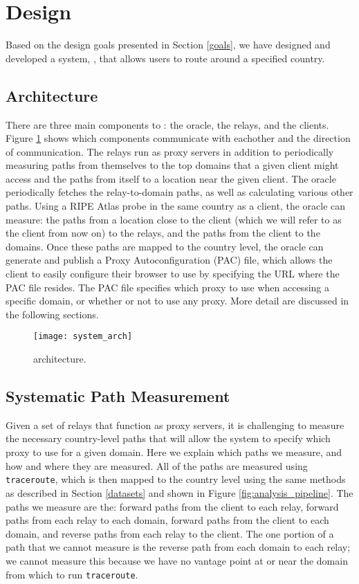 \section{Design}
\label{system_design}
Based on the design goals presented in Section \ref{goals}, we have designed 
and developed a system, \system{}, that allows users to route around a specified 
country.

\subsection{Architecture}

There are three main components to \system{}: the oracle, the relays, and the 
clients.  Figure \ref{fig:arch} shows which components communicate with 
eachother and the direction of communication.  The relays run as 
proxy servers in addition to periodically measuring paths from themselves to the 
top domains that a given client might access and the paths from itself to a 
location near the given client.  The oracle periodically fetches the 
relay-to-domain paths, as well as calculating various other paths.  Using a RIPE
 Atlas probe in the same country as a client, the oracle can measure: the paths
 from a location close to the client (which we will refer to as the client from 
now on) to the relays, and the paths from the client to the domains.  Once these
 paths are mapped to the country level, the oracle can generate and publish a 
Proxy Autoconfiguration (PAC) file, which allows the client to easily configure 
their browser to use \system{} by specifying the URL where the PAC file resides.
  The PAC file specifies which proxy to use when accessing a specific domain, 
or whether or not to use any proxy.  More detail are discussed in the following 
sections.

\begin{figure}[t]
\centering
\texttt{[image: system\_arch]}
\caption{\system{} architecture.}
\label{fig:arch}
\end{figure}

\subsection{Systematic Path Measurement}
Given a set of relays that function as proxy servers, it is challenging to 
measure the necessary country-level paths that will allow the system to specify 
which proxy to use for a given domain.  Here we explain which paths we measure, 
and how and where they are measured.  All of the paths are measured using {\tt 
traceroute}, which is then mapped to the country level using the same methods as 
described in Section \ref{datasets} and shown in Figure 
\ref{fig:analysis_pipeline}.  The paths we measure are the: forward paths from 
the client to each relay, forward paths from each relay to each domain, forward 
paths from the client to each domain, and reverse paths from each relay to the 
client.  The one portion of a path that we cannot measure is the reverse path 
from each domain to each relay; we cannot measure this because we have no 
vantage point at or near the domain from which to run {\tt traceroute}.

